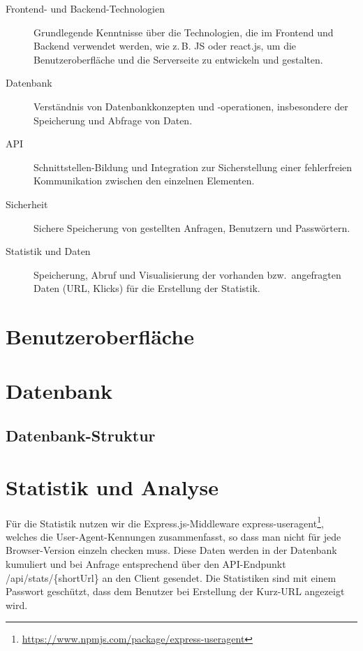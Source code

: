 \documentclass[a4paper,11pt,DIV=12,overfullrule=on]{scrreprt}%
\begin{document}
\begin{description}
    \item[Frontend- und Backend-Technologien] Grundlegende Kenntnisse über die Technologien, die im Frontend und Backend verwendet werden, wie z.\,B. \ac{JS} oder react.js, um die Benutzeroberfläche und die Serverseite zu entwickeln und gestalten.

    \item[Datenbank] Verständnis von Datenbankkonzepten und -operationen, insbesondere der Speicherung und Abfrage von Daten.

    \item[API] Schnittstellen-Bildung und Integration zur Sicherstellung einer fehlerfreien Kommunikation zwischen den einzelnen Elementen.

    \item[Sicherheit] Sichere Speicherung von gestellten Anfragen, Benutzern und Passwörtern.

    \item[Statistik und Daten] Speicherung, Abruf und Visualisierung der vorhanden bzw.\ angefragten Daten (\ac{URL}, Klicks) für die Erstellung der Statistik.
\end{description}

\section{Benutzeroberfläche}
\section{Datenbank}
\subsection{Datenbank-Struktur}
\section{Statistik und Analyse}
Für die Statistik nutzen wir die Express.js-Middleware {\ttfamily express-useragent}\footnote{\href{https://www.npmjs.com/package/express-useragent}{https://www.npmjs.com/package/express-useragent}}, welches die User-Agent-Kennungen zusammenfasst, so dass man nicht für jede Browser-Version einzeln checken muss. Diese Daten werden in der Datenbank kumuliert und bei Anfrage entsprechend über den \ac{API}-Endpunkt {\ttfamily /api/stats/\{shortUrl\}} an den Client gesendet. Die Statistiken sind mit einem Passwort geschützt, dass dem Benutzer bei Erstellung der Kurz-URL angezeigt wird.
\end{document}
